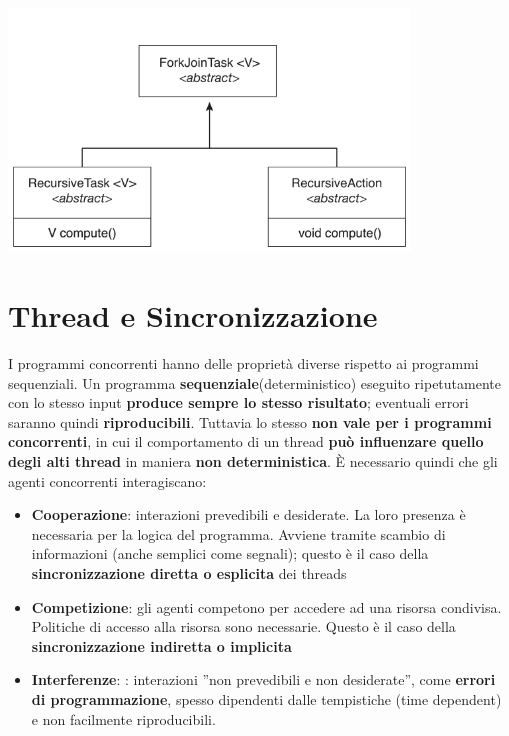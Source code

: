 \documentclass[12pt]{article}
\begin{document}
\begin{center}
    \includegraphics[width = 0.80\textwidth]{Images/80.PNG}
\end{center}
\newpage
\section{Thread e Sincronizzazione}
I programmi concorrenti hanno delle proprietà diverse rispetto ai programmi sequenziali. Un programma \textbf{sequenziale}(deterministico) eseguito ripetutamente con lo stesso input \textbf{produce sempre lo stesso risultato}; eventuali errori saranno quindi \textbf{riproducibili}. Tuttavia lo stesso \textbf{non vale per i programmi concorrenti}, in cui il comportamento di un thread \textbf{può influenzare quello degli alti thread} in maniera \textbf{non deterministica}. È necessario quindi che gli agenti concorrenti interagiscano:
\begin{itemize}
    \item \textbf{Cooperazione}: interazioni prevedibili e desiderate. La loro presenza è necessaria per la logica del programma. Avviene tramite scambio di informazioni (anche semplici come segnali); questo è il caso della \textbf{sincronizzazione diretta o esplicita} dei threads
    \item \textbf{Competizione}: gli agenti competono per accedere ad una risorsa condivisa. Politiche di accesso alla risorsa sono necessarie. Questo è il caso della \textbf{sincronizzazione indiretta o implicita}
    \item \textbf{Interferenze}: : interazioni ”non prevedibili e non desiderate”, come \textbf{errori di programmazione}, spesso dipendenti dalle tempistiche (time dependent) e non facilmente riproducibili.
\end{itemize}
\end{document}
